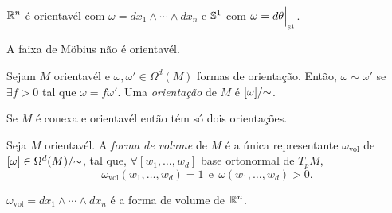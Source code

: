 \begin{example}
    \(\mathbb{R}^n\) é orientavél com \(\omega = dx_1 \wedge \cdots \wedge dx_n\) e \(\mathbb{S}^1\) com \(\omega = d\theta\Big|_{_{\mathbb{S}^1}}\).
\end{example}
\begin{example}
    A faixa de Möbius não é orientavél. 
\end{example}

\begin{definition}
    Sejam \(M\) orientavél e \(\omega, \omega{'} \in \Omega^d(M)\) formas de orientação.  Então, \(\omega \sim \omega{'}\) se \(\exists f>0\) tal que \(\omega = f \omega{'}\). Uma \emph{orientação} de \(M\) é \([\omega]/\hspace{-0.1cm}\sim\). 
\end{definition}

\begin{exercise}
    Se \(M\) é conexa e orientavél então tém só dois orientações. %
\end{exercise}

\begin{definition}
    Seja \(M\) orientavél. A \emph{forma de volume} de \(M\) é a única representante \(\omega_\text{vol}\) de \([\omega]\in \Omega^d(M)/\hspace{-0.1cm}\sim\), tal que, \(\forall [w_1, \ldots, w_d]\) base ortonormal de \(T_pM\), 
    \[\omega_\text{vol}(w_1, \ldots, w_d) = 1 \ \ \text{e} \ \ \omega(w_1,\ldots, w_d) > 0.\] 
\end{definition}

\begin{example}
    \(\omega_\text{vol} = dx_1 \wedge \cdots \wedge dx_n\) é a forma de volume de \(\mathbb{R}^n\). 
\end{example}


